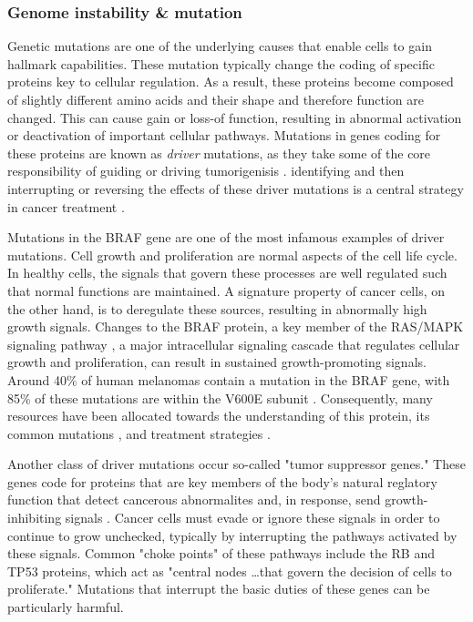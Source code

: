 \subsubsection{Genome instability \& mutation}
Genetic mutations are one of the underlying causes that enable cells to gain hallmark capabilities.
These mutation typically change the coding of specific proteins key to cellular regulation.
As a result, these proteins become composed of slightly different amino acids and their shape and therefore function are changed.
This can cause gain or loss-of function, resulting in abnormal activation or deactivation of important cellular pathways.
Mutations in genes coding for these proteins are known as \emph{driver} mutations, as they take some of the core responsibility of guiding or driving tumorigenisis \cite{martinez-jimenez2020}.
identifying and then interrupting or reversing the effects of these driver mutations is a central strategy in cancer treatment \cite{need}.

Mutations in the BRAF gene are one of the most infamous examples of driver mutations.
Cell growth and proliferation are normal aspects of the cell life cycle.
In healthy cells, the signals that govern these processes are well regulated such that normal functions are maintained.
A signature property of cancer cells, on the other hand, is to deregulate these sources, resulting in abnormally high growth signals.
Changes to the BRAF protein, a key member of the RAS/MAPK signaling pathway \cite{davies2010}, a major intracellular signaling cascade that regulates cellular growth and proliferation,
can result in sustained growth-promoting signals.
Around 40\% of human melanomas contain a mutation in the BRAF gene, with 
85\% of these mutations are within the V600E subunit \cite{spathis2019}.
Consequently, many resources have been allocated towards the understanding of this protein, its common mutations \cite{smiech2020}, and treatment strategies \cite{cheng2017}.

Another class of driver mutations occur so-called "tumor suppressor genes."
These genes code for proteins that are key members of the body's natural reglatory function that detect cancerous abnormalites and, in response, send growth-inhibiting signals \cite{need}.
Cancer cells must evade or ignore these signals in order to continue to grow unchecked,
typically by interrupting the pathways activated by these signals.
Common "choke points" of these pathways include the RB and TP53 proteins,
which act as "central nodes \ldots that govern the decision of cells to proliferate."
Mutations that interrupt the basic duties of these genes can be particularly harmful.

